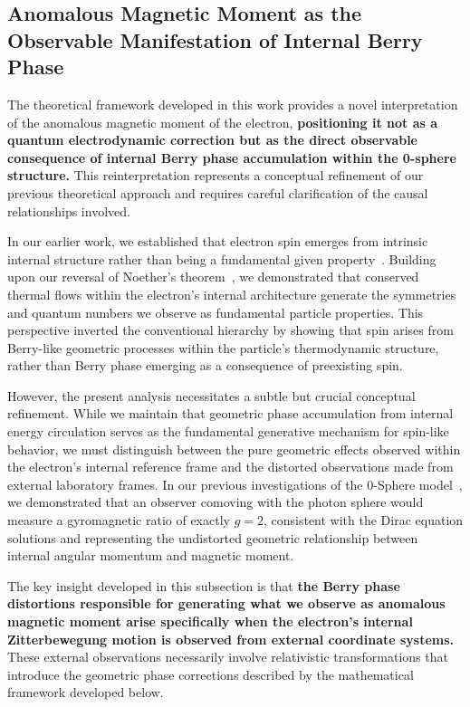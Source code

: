 \documentclass[%
 reprint,
 amsmath,amssymb,
 aps,
]{revtex4-1}
\numberwithin{equation}{section}%
\begin{document}
\subsection{Anomalous Magnetic Moment as the Observable Manifestation of Internal Berry Phase} \label{subsec:anomalous_magnetic}

The theoretical framework developed in this work provides a novel interpretation of the anomalous magnetic moment of the electron, \textbf{positioning it not as a quantum electrodynamic correction but as the direct observable consequence of internal Berry phase accumulation within the 0-sphere structure.} This reinterpretation represents a conceptual refinement of our previous theoretical approach and requires careful clarification of the causal relationships involved.

In our earlier work, we established that electron spin emerges from intrinsic internal structure rather than being a fundamental given property~\cite{hanamura2309.0047}. Building upon our reversal of Noether's theorem~\cite{hanamura2506.0119}, we demonstrated that conserved thermal flows within the electron's internal architecture generate the symmetries and quantum numbers we observe as fundamental particle properties. This perspective inverted the conventional hierarchy by showing that spin arises from Berry-like geometric processes within the particle's thermodynamic structure, rather than Berry phase emerging as a consequence of preexisting spin.

However, the present analysis necessitates a subtle but crucial conceptual refinement. While we maintain that geometric phase accumulation from internal energy circulation serves as the fundamental generative mechanism for spin-like behavior, we must distinguish between the pure geometric effects observed within the electron's internal reference frame and the distorted observations made from external laboratory frames. In our previous investigations of the 0-Sphere model~\cite{hanamura2501.0130}, we demonstrated that an observer comoving with the photon sphere would measure a gyromagnetic ratio of exactly $g = 2$, consistent with the Dirac equation solutions and representing the undistorted geometric relationship between internal angular momentum and magnetic moment.

The key insight developed in this subsection is that \textbf{the Berry phase distortions responsible for generating what we observe as anomalous magnetic moment arise specifically when the electron's internal Zitterbewegung motion is observed from external coordinate systems.} These external observations necessarily involve relativistic transformations that introduce the geometric phase corrections described by the mathematical framework developed below.
\end{document}

